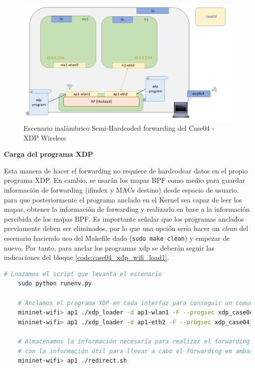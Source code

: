 \begin{figure}[ht]
    \centering
    \includegraphics[width=16cm]{archivos/img/dev/xdp-wifi/case04/scenario_b.png}
    \caption{Escenario inalámbrico Semi-Hardcoded forwarding del Case04 - XDP Wireless}
    \label{fig:case04_xdp_wifi_scenario2}
\end{figure}


\vspace{0.5cm}
\textbf{Carga del programa XDP}\\
\par

Esta manera de hacer el forwarding no requiere de hardcodear datos en el propio programa XDP. En cambio, se usarán los mapas BPF como medio para guardar información de forwarding (ifindex y MACs destino) desde espacio de usuario, para que posteriormente el programa anclado en el Kernel sea capaz de leer los mapas, obtener la información de forwarding y realizarlo en base a la información percibida de los mapas BPF. Es importante señalar que los programas anclados previamente deben ser eliminados, por lo que una opción sería hacer un \textit{clean} del escenario haciendo uso del Makefile dado (\texttt{sudo make clean}) y empezar de nuevo. Por tanto, para anclar los programas \gls{xdp} se deberán seguir las indicaciones del bloque \ref{code:case04_xdp_wifi_load1}.

\begin{lstlisting}[language= bash, style=Consola, caption={Carga del programa XDP Semi-Hardcoded forwarding - Case04},label=code:case04_xdp_wifi_load2]
    # Lnazamos el script que levanta el escenario
    sudo python runenv.py
    
    # Anclamos el programa XDP en cada interfaz para conseguir un comunicación bidireccional 
    mininet-wifi> ap1 ./xdp_loader -d ap1-wlan1 -F --progsec xdp_case04_map -S
    mininet-wifi> ap1 ./xdp_loader -d ap1-eth2 -F --progsec xdp_case04_map -S
    
    # Almacenamos la información necesaria para realizar el forwarding y populamos los mapas BPF
    # con la información útil para llevar a cabo el forwarding en ambas direcciones.
    mininet-wifi> ap1 ./redirect.sh
\end{lstlisting}

